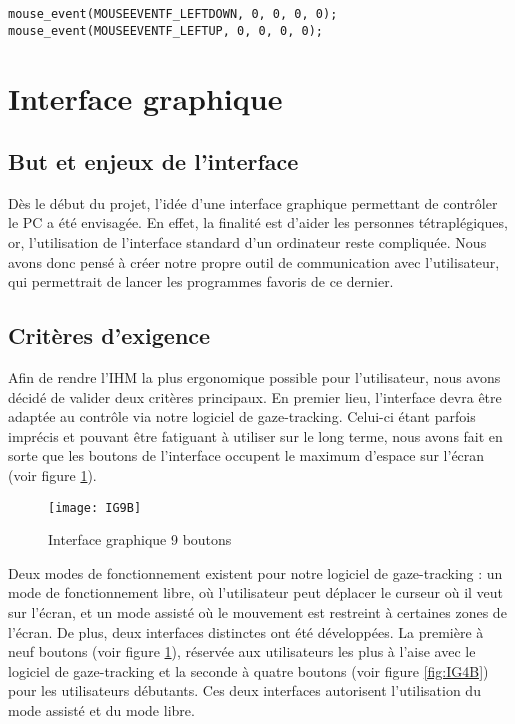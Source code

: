 \begin{lstlisting}
mouse_event(MOUSEEVENTF_LEFTDOWN, 0, 0, 0, 0);
mouse_event(MOUSEEVENTF_LEFTUP, 0, 0, 0, 0);
\end{lstlisting}

\section{Interface graphique}

\subsection{But et enjeux de l’interface}

Dès le début du projet, l’idée d’une interface graphique permettant de contrôler le PC a été envisagée. En effet, la finalité est d’aider les personnes tétraplégiques, or, l’utilisation de l’interface standard d’un ordinateur reste compliquée. Nous avons donc pensé à créer notre propre outil de communication avec l'utilisateur, qui permettrait de lancer les programmes favoris de ce dernier.

\subsection{Critères d’exigence}

Afin de rendre l’IHM la plus ergonomique possible pour l’utilisateur, nous avons décidé de valider deux critères principaux. En premier lieu, l’interface devra être adaptée au contrôle via notre logiciel de gaze-tracking. Celui-ci étant parfois imprécis et pouvant être fatiguant à utiliser sur le long terme, nous avons fait en sorte que les boutons de l’interface occupent le maximum d’espace sur l’écran (voir figure \ref{fig:IG9B}).

\begin{figure}[H]
  \centering
  \texttt{[image: IG9B]}
  \caption{Interface graphique 9 boutons}
  \label{fig:IG9B}
\end{figure}

Deux modes de fonctionnement existent pour notre logiciel de gaze-tracking : un mode de fonctionnement libre, où l’utilisateur peut déplacer le curseur où il veut sur l’écran, et un mode assisté où le mouvement est restreint à certaines zones de l’écran. De plus, deux interfaces distinctes ont été développées. La première à neuf boutons (voir figure \ref{fig:IG9B}), réservée aux utilisateurs les plus à l’aise avec le logiciel de gaze-tracking et la seconde à quatre boutons (voir figure \ref{fig:IG4B}) pour les utilisateurs débutants. Ces deux interfaces autorisent l’utilisation du mode assisté et du mode libre.

